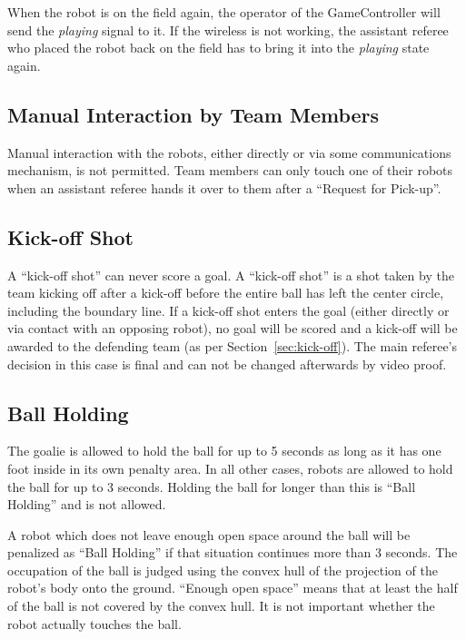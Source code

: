 \documentclass[12pt]{article}
\begin{document}
When the robot is on the field again, the operator of the GameController will send the \emph{playing} signal to it. If the wireless is not working, the assistant referee who placed the robot back on the field has to bring it into the \emph{playing} state again.

\subsection{Manual Interaction by Team Members}

Manual interaction with the robots, either directly or via some communications mechanism, is not permitted. Team members can only touch one of their robots when an assistant referee hands it over to them after a ``Request for Pick-up''.

\subsection{Kick-off Shot}
\label{sec:kick-off_shot}

A ``kick-off shot'' can never score a goal. A ``kick-off shot'' is a shot taken by the team kicking off after a kick-off before the entire ball has left the center circle, including the boundary line. 
If a kick-off shot enters the goal (either directly or via contact with an opposing robot), no goal will be scored and a kick-off will be awarded to the defending team (as per Section~\ref{sec:kick-off}).
The main referee's decision in this case is final and can not be changed afterwards by video proof.

\subsection{Ball Holding}
\label{sec:ball_holding}

The goalie is allowed to hold the ball for up to 5 seconds as long as it has one foot inside in its own penalty area. In all other cases, robots are allowed to hold the ball for up to 3 seconds. Holding the ball for longer than this is ``Ball Holding'' and is not allowed.

A robot which does not leave enough open space around the ball will be penalized as ``Ball Holding'' if that situation continues more than 3 seconds. The occupation of the ball is judged using the convex hull of the projection of the robot's body onto the ground. ``Enough open space'' means that at least the half of the ball is not covered by the convex hull. It is not important whether the robot actually touches the ball.
\end{document}
